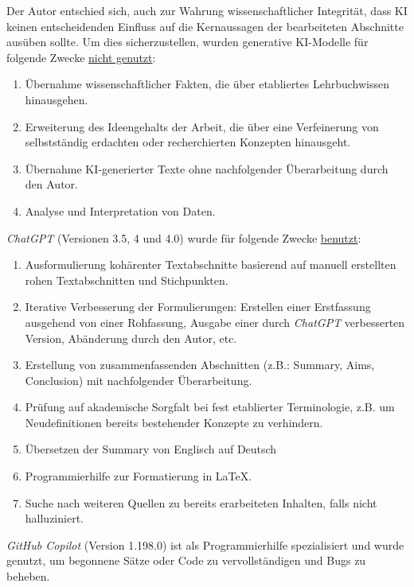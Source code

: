 \noindent Der Autor entschied sich, auch zur Wahrung wissenschaftlicher Integrität, dass
KI keinen entscheidenden Einfluss auf die Kernaussagen der bearbeiteten
Abschnitte ausüben sollte. Um dies sicherzustellen, wurden generative KI-Modelle
für folgende Zwecke \underline{nicht genutzt}:
\begin{enumerate}
    \item Übernahme wissenschaftlicher Fakten, die über etabliertes Lehrbuchwissen hinausgehen.
    \item Erweiterung des Ideengehalts der Arbeit, die über eine Verfeinerung
          von selbstständig erdachten oder recherchierten Konzepten hinausgeht.
    \item Übernahme KI-generierter Texte ohne nachfolgender Überarbeitung durch den Autor.
    \item Analyse und Interpretation von Daten.
\end{enumerate}

\noindent \textit{ChatGPT} (Versionen 3.5, 4 und 4.0) wurde für folgende Zwecke \underline{benutzt}:
\begin{enumerate}
    \item Ausformulierung kohärenter Textabschnitte basierend auf manuell
          erstellten rohen Textabschnitten und Stichpunkten.
    \item Iterative Verbesserung der Formulierungen: Erstellen einer Erstfassung
          ausgehend von einer Rohfassung, Ausgabe einer durch \textit{ChatGPT} verbesserten
          Version, Abänderung durch den Autor, etc.
    \item Erstellung von zusammenfassenden Abschnitten (z.B.: Summary, Aims,
          Conclusion) mit nachfolgender Überarbeitung.
    \item Prüfung auf akademische Sorgfalt bei fest etablierter Terminologie,
          z.B. um Neudefinitionen bereits bestehender Konzepte zu verhindern.
    \item Übersetzen der Summary von Englisch auf Deutsch
    \item Programmierhilfe zur Formatierung in LaTeX.
    \item Suche nach weiteren Quellen zu bereits erarbeiteten Inhalten, falls nicht halluziniert.
\end{enumerate}

\noindent \textit{GitHub Copilot} (Version 1.198.0) ist als Programmierhilfe
spezialisiert und wurde genutzt, um begonnene Sätze oder Code zu
vervollständigen und Bugs zu beheben.

